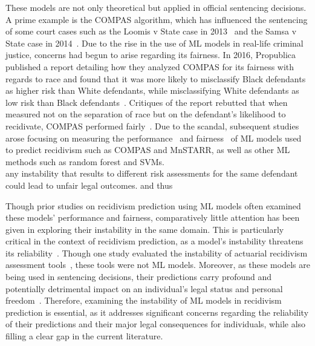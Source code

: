\documentclass[12pt]{article}
\begin{document}
These models are not only theoretical but applied in official sentencing decisions. A prime example is the COMPAS algorithm, which has influenced the sentencing of some court cases such as the Loomis v State case in 2013~\cite{loomis2016} and the Samsa v State case in 2014~\cite{samsa2014}. Due to the rise in the use of ML models in real-life criminal justice, concerns had begun to arise regarding its fairness. In 2016, Propublica published a report detailing how they analyzed COMPAS for its fairness with regards to race and found that it was more likely to misclassify Black defendants as higher risk than White defendants, while misclassifying White defendants as low risk than Black defendants~\cite{propublica2016analysis}. Critiques of the report rebutted that when measured not on the separation of race but on the defendant's likelihood to recidivate, COMPAS performed fairly~\cite{dieterich2016compas, corbett2017algorithmic, flores2016false}. Due to the scandal, subsequent studies arose focusing on measuring the performance~\cite{tollenaar2013method, travaini2022machine} and fairness~\cite{dressel2018accuracy, tolan2019machine, wadsworth2018achieving} of ML models used to predict recidivism such as COMPAS and MnSTARR, as well as other ML methods such as random forest and SVMs.\\



any instability that results to different risk assessments for the same defendant could lead to unfair legal outcomes.  and thus 

Though prior studies on recidivism prediction using ML models often examined these models' performance and fairness, comparatively little attention has been given in exploring their instability in the same domain. This is particularly critical in the context of recidivism prediction, as a model's instability threatens its reliability~\cite{riley2023stability}. Though one study evaluated the instability of actuarial recidivism assessment tools~\cite{helmus2015stability}, these tools were not ML models. Moreover, as these models are being used in sentencing decisions, their predictions carry profound and potentially detrimental impact on an individual's legal status and personal freedom~\cite{van2022predicting}. Therefore, examining the instability of ML models in recidivism prediction is essential, as it addresses significant concerns regarding the reliability of their predictions and their major legal consequences for individuals, while also filling a clear gap in the current literature. \\
\end{document}
